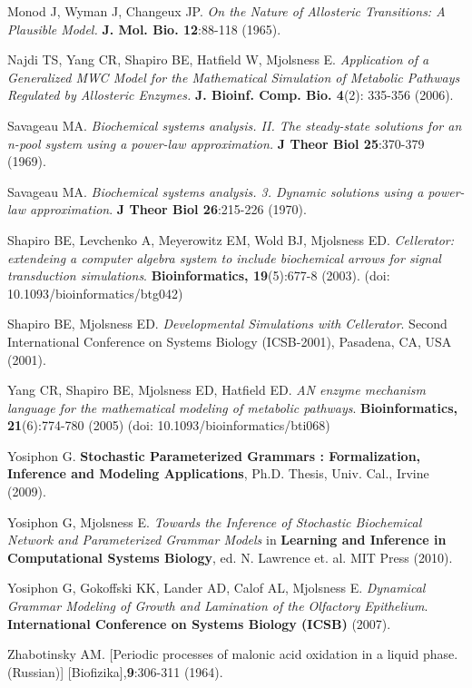 \begin{thebibliography}{99}
Monod J, Wyman J, Changeux JP. 
\textit{On the Nature of Allosteric Transitions: A Plausible Model.}
\textbf{J. Mol. Bio. 12}:88-118 (1965). 

Najdi TS, Yang CR, Shapiro BE, Hatfield W, Mjolsness E.
\textit{Application of a Generalized MWC Model for the Mathematical Simulation of Metabolic Pathways Regulated by Allosteric Enzymes.}
\textbf{J. Bioinf. Comp. Bio. 4}(2): 335-356 (2006). 

Savageau MA.
\textit{Biochemical systems analysis. II. The steady-state solutions for an n-pool system using a power-law approximation.}
\textbf{J Theor Biol 25}:370-379 (1969).

Savageau MA. 
\textit{Biochemical systems analysis. 3. Dynamic solutions using a power-law approximation}. 
\textbf{J Theor Biol 26}:215-226 (1970).


Shapiro BE, Levchenko A, Meyerowitz EM, Wold BJ, Mjolsness ED.
\textit{Cellerator: extendeing a computer algebra system to include biochemical arrows for signal transduction simulations}.
\textbf{Bioinformatics, 19}(5):677-8 (2003). (doi: 10.1093/bioinformatics/btg042)

Shapiro BE, Mjolsness ED.
\textit{Developmental Simulations with Cellerator}.
Second International Conference on Systems Biology (ICSB-2001), Pasadena, CA, USA (2001). 

Yang CR, Shapiro BE, Mjolsness ED, Hatfield ED.
\textit{AN enzyme mechanism language for the mathematical modeling of metabolic pathways}.
\textbf{Bioinformatics, 21}(6):774-780 (2005) (doi: 10.1093/bioinformatics/bti068)

Yosiphon G.
\textbf{Stochastic Parameterized Grammars : Formalization, Inference and Modeling Applications}, Ph.D. Thesis, Univ. Cal., Irvine (2009). 

Yosiphon G, Mjolsness E.
\textit{Towards the Inference of Stochastic Biochemical Network and Parameterized Grammar Models}
in \textbf{Learning and Inference in Computational Systems Biology},
ed. N. Lawrence et. al. 
 MIT Press (2010).
 
Yosiphon G, Gokoffski KK, Lander AD, Calof AL, Mjolsness E. 
\textit{Dynamical Grammar Modeling of Growth and Lamination of the Olfactory Epithelium}.
\textbf{International Conference on Systems Biology (ICSB)} (2007).

Zhabotinsky AM.
[Periodic processes of malonic acid oxidation in a liquid phase. (Russian)]
[Biofizika],\textbf{9}:306-311 (1964).

\end{thebibliography}

